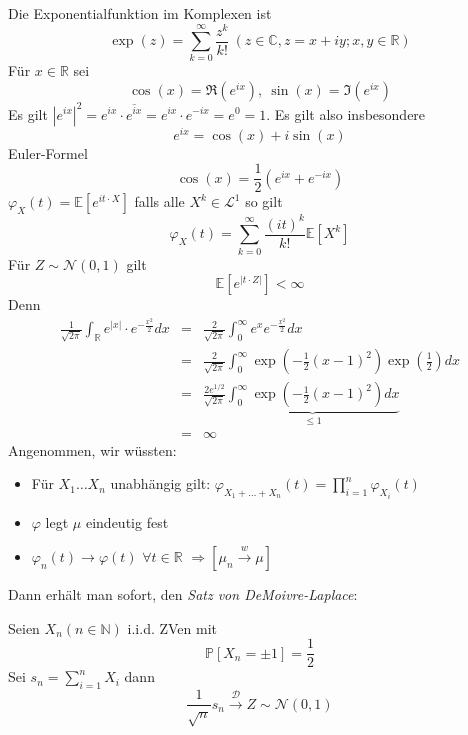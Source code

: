 \documentclass[10pt,a4paper]{report}
\numberwithin{equation}{section}
\numberwithin{figure}{section}
\theoremstyle{plain}
\theoremstyle{definition}
\theoremstyle{plain}
\theoremstyle{definition}
\theoremstyle{remark}
\theoremstyle{plain}
\theoremstyle{plain}
\theoremstyle{plain}
\theoremstyle{plain}
\theoremstyle{plain}
\newcommand{\1}{ \mathbb{1} } %
\begin{document}
Die Exponentialfunktion im Komplexen ist 
\[
\exp\left(z\right)=\sum_{k=0}^{\infty}\frac{z^{k}}{k!}\ \left(z\in\mathbb{C},z=x+iy;x,y\in\mathbb{R}\right)
\]
Für $x\in\mathbb{R}$ sei
\[
\cos\left(x\right)=\Re\left(e^{ix}\right),\ \sin\left(x\right)=\Im\left(e^{ix}\right)
\]
Es gilt $\left|e^{ix}\right|^{2}=e^{ix}\cdot\overline{e^{ix}}=e^{ix}\cdot e^{-ix}=e^{0}=1$.
Es gilt also insbesondere 
\[
e^{ix}=\cos\left(x\right)+i\sin\left(x\right)
\]
Euler-Formel 
\[
\cos\left(x\right)=\frac{1}{2}\left(e^{ix}+e^{-ix}\right)
\]
$\varphi_{X}\left(t\right)=\mathbb{E}\left[e^{it\cdot X}\right]$
falls alle $X^{k}\in\mathcal{L}^{1}$ so gilt 
\[
\varphi_{X}\left(t\right)=\sum_{k=0}^{\infty}\frac{\left(it\right)^{k}}{k!}\mathbb{E}\left[X^{k}\right]
\]
Für $Z\sim\mathcal{N}\left(0,1\right)$ gilt
\[
\mathbb{E}\left[e^{\left|t\cdot Z\right|}\right]<\infty
\]
Denn 
\begin{eqnarray*}
\frac{1}{\sqrt{2\pi}}\int_{\mathbb{R}}e^{\left|x\right|}\cdot e^{-\frac{x^{2}}{2}}dx & = & \frac{2}{\sqrt{2\pi}}\int_{0}^{\infty}e^{x}e^{-\frac{x^{2}}{2}}dx\\
 & = & \frac{2}{\sqrt{2\pi}}\int_{0}^{\infty}\exp\left(-\frac{1}{2}\left(x-1\right)^{2}\right)\exp\left(\frac{1}{2}\right)dx\\
 & = & \frac{2e^{1/2}}{\sqrt{2\pi}}\underset{\leq1}{\underbrace{\int_{0}^{\infty}\exp\left(-\frac{1}{2}\left(x-1\right)^{2}\right)dx}}\\
 & = & \infty
\end{eqnarray*}
Angenommen, wir wüssten:
\begin{itemize}
\item Für $X_{1}\ldots X_{n}$ unabhängig gilt: $\varphi_{X_{1}+\ldots+X_{n}}\left(t\right)=\prod_{i=1}^{n}\varphi_{X_{i}}\left(t\right)$
\item $\varphi$ legt $\mu$ eindeutig fest
\item $\varphi_{n}\left(t\right)\to\varphi\left(t\right)$ $\forall t\in\mathbb{R}$
$\Rightarrow\left[\mu_{n}\overset{w}{\longrightarrow}\mu\right]$
\end{itemize}
Dann erhält man sofort, den \emph{Satz von DeMoivre-Laplace}:

Seien $X_{n}\left(n\in\mathbb{N}\right)$ i.i.d. ZVen mit 
\[
\mathbb{P}\left[X_{n}=\pm1\right]=\frac{1}{2}
\]
Sei $s_{n}=\sum_{i=1}^{n}X_{i}$ dann 
\[
\frac{1}{\sqrt{n}}s_{n}\overset{\mathcal{D}}{\longrightarrow}Z\sim\mathcal{N}\left(0,1\right)
\]

\end{document}
